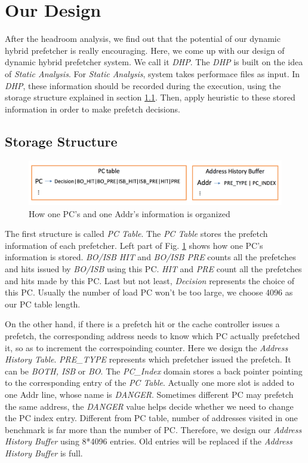 \section{Our Design}
\label{sec:ourdesign}

After the headroom analysis, we find out that the potential of our dynamic hybrid prefetcher is really encouraging. Here, we come up with our design of dynamic hybrid prefetcher system. We call it \emph{DHP}. The \emph{DHP} is built on the idea of \emph{Static Analysis}. For \emph{Static Analysis}, system takes performace files as input. In \emph{DHP}, these information should be recorded during the execution, using the storage structure explained in section \ref{sec:storestruct}. Then, apply heuristic to these stored information in order to make prefetch decisions.

  \subsection{Storage Structure}
  \label{sec:storestruct}
  \begin{figure}[ht!]
	   \centering
	   \includegraphics[width=1.0\textwidth]{images/storage_struct.png}
	   \caption{How one PC's and one Addr's information is organized}
	   \label{fig:storage_struct}
  \end{figure}

  The first structure is called \emph{PC Table}. The \emph{PC Table} stores the prefetch information of each prefetcher. Left part of Fig. \ref{fig:storage_struct} shows how one PC's information is stored. \emph{BO/ISB HIT} and \emph{BO/ISB PRE} counts all the prefetches and hits issued by \emph{BO/ISB} using this PC. \emph{HIT} and \emph{PRE} count all the prefetches and hits made by this PC. Last but not least, \emph{Decision} represents the choice of this PC. Usually the number of load PC won't be too large, we choose 4096 as our PC table length.

  On the other hand, if there is a prefetch hit or the cache controller issues a prefetch, the corresponding address needs to know which PC actually prefetched it, so as to increment the correspoinding counter. Here we design the \emph{Address History Table}. \emph{PRE\_TYPE} represents which prefetcher issued the prefetch. It can be \emph{BOTH, ISB} or \emph{BO}. The \emph{PC\_Index} domain stores a back pointer pointing to the corresponding entry of the \emph{PC Table}. Actually one more slot is added to one Addr line, whose name is \emph{DANGER}. Sometimes different PC may prefetch the same address, the \emph{DANGER} value helps decide whether we need to change the PC index entry. Different from PC table, number of addresses visited in one benchmark is far more than the number of PC. Therefore, we design our \emph{Address History Buffer} using 8*4096 entries. Old entries will be replaced if the \emph{Address History Buffer} is full.

